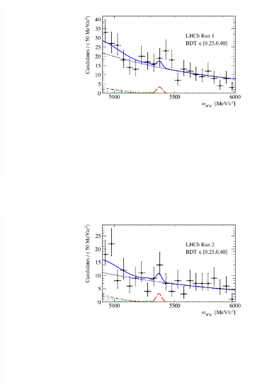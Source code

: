 {{%


\begin{figure}[htbp]
    \centering
    \begin{subfigure}[b]{0.48\textwidth}
        \includegraphics[width=\textwidth]{./Figs/BFAnalysis/Fig17a.pdf}
    \end{subfigure}
    ~ %
    \begin{subfigure}[b]{0.48\textwidth}
       \includegraphics[width=\textwidth]{./Figs/BFAnalysis/Fig17e.pdf}

\end{subfigure}
\end{figure}}}
